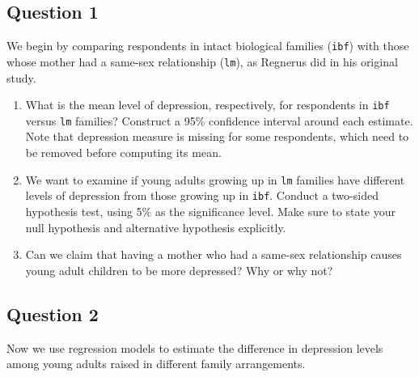 \documentclass[]{article}
\begin{document}
\subsection{Question 1}\label{question-1}

We begin by comparing respondents in intact biological families
(\texttt{ibf}) with those whose mother had a same-sex relationship
(\texttt{lm}), as Regnerus did in his original study.

\begin{enumerate}
\def\labelenumi{\alph{enumi}.}
\item
  What is the mean level of depression, respectively, for respondents in
  \texttt{ibf} versus \texttt{lm} families? Construct a 95\% confidence
  interval around each estimate. Note that depression measure is missing
  for some respondents, which need to be removed before computing its
  mean.
\item
  We want to examine if young adults growing up in \texttt{lm} families
  have different levels of depression from those growing up in
  \texttt{ibf}. Conduct a two-sided hypothesis test, using 5\% as the
  significance level. Make sure to state your null hypothesis and
  alternative hypothesis explicitly.
\item
  Can we claim that having a mother who had a same-sex relationship
  causes young adult children to be more depressed? Why or why not?
\end{enumerate}

\subsection{Question 2}\label{question-2}

Now we use regression models to estimate the difference in depression
levels among young adults raised in different family arrangements.
\end{document}
